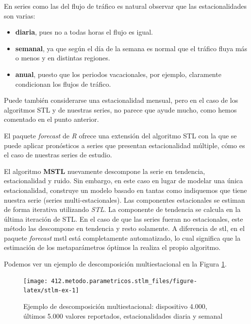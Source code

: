 \documentclass[]{book}
\providecommand{\tightlist}{%
  \setlength{\itemsep}{0pt}\setlength{\parskip}{0pt}}
\begin{document}
En series como las del flujo de tráfico es natural observar que las
estacionalidades son varias:

\begin{itemize}
\tightlist
\item
  \textbf{diaria}, pues no a todas horas el flujo es igual.
\item
  \textbf{semanal}, ya que según el día de la semana es normal que el
  tráfico fluya más o menos y en distintas regiones.
\item
  \textbf{anual}, puesto que los periodos vacacionales, por ejemplo,
  claramente condicionan los flujos de tráfico.
\end{itemize}

Puede también considerarse una estacionalidad mensual, pero en el caso
de los algoritmos STL y de nuestras series, no parece que ayude mucho,
como hemos comentado en el punto anterior.

El paquete \emph{forecast} de \emph{R} ofrece una extensión del
algoritmo STL con la que se puede aplicar pronósticos a series que
presentan estacionalidad múltiple, cómo es el caso de nuestras series de
estudio.

El algoritmo \textbf{MSTL} nuevamente descompone la serie en tendencia,
estacionalidad y ruido. Sin embargo, en este caso en lugar de modelar
una única estacionalidad, construye un modelo basado en tantas como
indiquemos que tiene nuestra serie (series multi-estacionales). Las
componentes estacionales se estiman de forma iterativa utilizando
\emph{STL}. La componente de tendencia se calcula en la última iteración
de STL. En el caso de que las series fueran no estacionales, este método
las descompone en tendencia y resto solamente. A diferencia de stl, en
el paquete \emph{forecast} mstl está completamente automatizado, lo cual
significa que la estimación de los metaparámetros óptimos la realiza el
propio algoritmo.

Podemos ver un ejemplo de descomposición multiestacional en la Figura
\ref{fig:stlm-ex}.

\begin{figure}

{\centering \texttt{[image: 412.metodo.parametricos.stlm\_files/figure-latex/stlm-ex-1]} 

}

\caption{Ejemplo de descomposición multiestacional: dispositivo 4.000, últimos 5.000 valores reportados, estacionalidades diaria y semanal}\label{fig:stlm-ex}
\end{figure}
\end{document}
